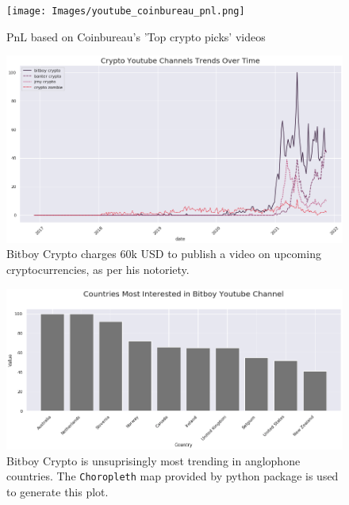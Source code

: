 \documentclass[twoside]{report}
\newcommand{\code}{\texttt}
\begin{document}
\begin{spacing}{1}
\begin{figure}[!htbp]
    \centering
    \texttt{[image: Images/youtube\_coinbureau\_pnl.png]}
    \caption{PnL based on Coinbureau's 'Top crypto picks' videos}
    \label{youtube_coinbureau_pnl}
\end{figure}

\begin{figure}[!htbp]
    \centering
    \includegraphics[scale = 0.5]{Images/youtube_channel_crypto_trends.png}
    \caption{Bitboy Crypto charges 60k USD to publish a video on upcoming cryptocurrencies, as per his notoriety.}
    \label{youtube_channel_crypto_trends}
\end{figure}

\begin{figure}[!htbp]
    \centering
    \includegraphics[scale = 0.5]{Images/countries_rank_bitboy_crypto_youtube.png}
    \caption{Bitboy Crypto is unsuprisingly most trending in anglophone countries. The \code{Choropleth} map provided by  python package is used to generate this plot.}
    \label{countries_rank_bitboy_crypto_youtube}
\end{figure}


\end{spacing}
\end{document}
